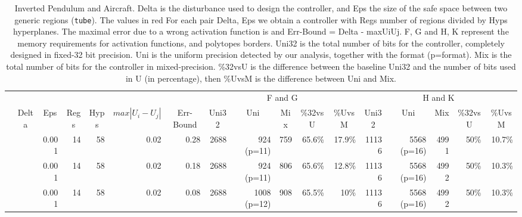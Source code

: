 \begin{landscape}
	\pagestyle{empty}
\begin{table}[p]
	\centering
	\caption{Inverted Pendulum and Aircraft.\textmd{ Delta is the disturbance used to design the controller, and Eps the size of the safe space between two generic regions (\texttt{tube}). The values in red For each pair Delta, Eps we obtain a controller with Regs number of regions divided by Hyps hyperplanes. The maximal error due to a wrong activation function is \maxUij and Err-Bound = Delta - maxUiUj. F, G and H, K represent the memory requirements for activation functions, and polytopes borders. Uni32 is the total number of bits for the controller, completely designed in fixed-32 bit precision. Uni is the uniform precision detected by our analysis, together with the format (p=format). Mix is the total number of bits for the controller in mixed-precision. \%32vsU is the difference between the baseline Uni32 and the number of bits used in U (in percentage), then \%UvsM is the difference between Uni and Mix.}}
	\label{tab:ipd}
	\begin{tabular}{|l|rrrrrrrrrrrrrrrr|}
		\cline{8-12}
		\cline{12-17}
		\multicolumn{1}{c}{} & %
		\multicolumn{4}{c}{} &
		\multicolumn{2}{c}{} &
		\multicolumn{5}{|c|}{F and G} &
		\multicolumn{5}{c|}{H and K} \\
		\cline{2-17}
		\multicolumn{1}{c}{\multirow{14}{*}{\rotatebox{90}{pendulum}}} &
		\multicolumn{1}{|c}{Delta}&
		\multicolumn{1}{c}{Eps} &
		\multicolumn{1}{c}{Regs} &
		\multicolumn{1}{c}{Hyps} &
		\multicolumn{1}{c}{$max|U_{i}-U_{j}|$} &
		\multicolumn{1}{c}{Err-Bound} &
		\multicolumn{1}{c}{Uni32}&
		\multicolumn{1}{c}{Uni}&
		\multicolumn{1}{c}{Mix}&
		\multicolumn{1}{c}{\%32vsU}&
		\multicolumn{1}{c}{\%UvsM}&
		\multicolumn{1}{c}{Uni32}&
		\multicolumn{1}{c}{Uni}&
		\multicolumn{1}{c}{Mix}&
		\multicolumn{1}{c}{\%32vsU}&
		\multicolumn{1}{c|}{\%UvsM} \\
		\cline{1-17}
		& \color{red}{0.30} & 0.001 & 14 & 58 & 0.02 & 0.28 & 2688 & 924 (p=11) & 759 & 65.6\% & 17.9\% & 11136 & 5568 (p=16) & 4991 & 50\% & 10.7\% \\
		
		& \color{red}{0.20} & 0.001 & 14 & 58 & 0.02 & 0.18 & 2688 & 924 (p=11) & 806 & 65.6\% & 12.8\% & 11136 & 5568 (p=16)& 4992 & 50\% & 10.3\% \\
		
		& \color{red}{0.10} & 0.001 & 14 & 58 & 0.02 & 0.08 & 2688 & 1008 (p=12) & 908 & 65.5\% & 10\% & 11136 & 5568 (p=16)& 4992 & 50\% & 10.3\% \\
		

\end{tabular}
\end{table}
\end{landscape}
